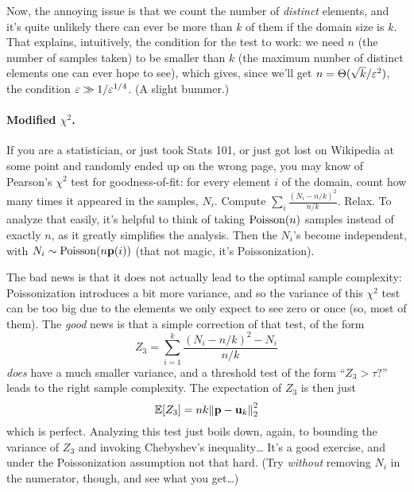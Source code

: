 \documentclass[10pt]{article}
\newcommand{\dst}{\eps}
\newcommand{\ab}{k}
\newcommand{\ns}{n}
\newcommand{\p}{\mathbf{p}}
\renewcommand{\uniform}{\mathbf{u}}
\begin{document}
Now, the annoying issue is that we count the number of \emph{distinct} elements, and it's quite unlikely there can ever be more than $\ab$ of them if the domain size is $\ab$. That explains, intuitively, the condition for the test to work: we need $\ns$ (the number of samples taken) to be smaller than $\ab$ (the maximum number of distinct elements one can ever hope to see), which gives, since we'll get $\ns = \Theta(\sqrt{\ab}/\dst^2)$, the condition $\dst \gg 1/\dst^{1/4}$. (A slight bummer.)

\paragraph{Modified $\chi^2$.} If you are a statistician, or just took Stats 101, or just got lost on Wikipedia at some point and randomly ended up on the wrong page, you may know of Pearson's $\chi^2$ test for goodness-of-fit: for every element $i$ of the domain, count how many times it appeared in the samples, $N_i$. Compute $\sum_{i} \frac{(N_i-\ns/\ab)^2}{\ns/\ab}$. Relax. 
To analyze that easily, it's helpful to think of taking $\poisson{\ns}$ samples instead of exactly $\ns$, as it greatly simplifies the analysis. Then the $N_i$'s become independent, with $N_i\sim\poisson{\ns\p(i)}$ (that not magic, it's Poissonization).

The bad news is that it does not actually lead to the optimal sample complexity: Poissonization introduces a bit more variance, and so the variance of this $\chi^2$ test can be too big due to the elements we only expect to see zero or once (so, most of them). The \emph{good} news is that a simple correction of that test, of the form
\begin{equation}
    Z_3 = \sum_{i=1}^\ab \frac{(N_i-\ns/\ab)^2- N_i}{\ns/\ab}
\end{equation}
\emph{does} have a much smaller variance, and a threshold test of the form ``$Z_3 > \tau$?'' leads to the right sample complexity. The expectation of $Z_3$ is then just 
\[
    \expect{Z_3} = \ns\ab \normtwo{\p-\uniform_k}^2
\]
which is perfect. Analyzing this test just boils down, again, to bounding the variance of $Z_3$ and invoking Chebyshev's inequality\dots{} It's a good exercise, and under the Poissonization assumption not that hard. (Try \emph{without} removing $N_i$ in the numerator, though, and see what you get\dots)
\end{document}
